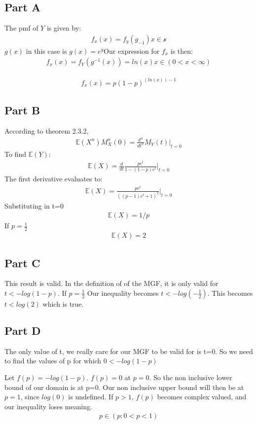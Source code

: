 \documentclass{article}
\begin{document}
\subsection*{Part A}
The pmf of $Y$ is given by:
\begin{align*}
f_x(x) = f_y(g_{-1}) x\in \mathcal{x}
\end{align*}
$g(x)$ in this case is $g(x)=e^y$Our expression for $f_x$ is then:
\begin{align*}
f_x(x) = f_Y(g^{-1}(x)) = ln(x) x\in (0<x<\infty)
\end{align*}

\begin{align*}
\boxed{ f_x(x) = p(1-p)^{(ln(x))-1} }
\end{align*}
\subsection*{Part B}
According to theorem 2.3.2,
\begin{align*}
\mathbb{E}(X^n)M_X^{n}(0) = \frac{d^n}{dt^n}M_Y(t)|_{t=0}
\end{align*}
To find $\mathbb{E}(Y)$:
\begin{align*}
\mathbb{E}(X) = \frac{d}{dt}\frac{pe^t}{1-(1-p)e^t}|_{t=0}
\end{align*}
The first derivative evaluates to:
\begin{align*}
\mathbb{E}(X) = \frac{p e^t}{((p-1)e^t+1)^2}|_{t=0}
\end{align*}
Substituting in t=0
\begin{align*}
\mathbb{E}(X) = 1/p
\end{align*}
If $p=\frac{1}{2}$
\begin{align*}
\boxed{\mathbb{E}(X) = 2}
\end{align*}
\subsection*{Part C}
This result is valid. In the definition of of the MGF, it is only valid for $t < -log(1-p)$. If $p=\frac{1}{2}$
Our inequality becomes $t<-log(-\frac{1}{2})$. This becomes $t<log(2)$ which is true.
\subsection*{Part D}
The only value of t, we really care for our MGF to be valid for is t=0. So we need to find the values of p for which $0<-log(1-p)$

Let $f(p)=-log(1-p)$. $f(p)=0$ at $p=0$. So the non inclusive lower bound of our domain is at p=0. Our non inclusive upper bound will then be at $p=1$, since $log(0)$ is undefined. If $p>1$, $f(p)$ becomes complex valued, and our inequality loses meaning.
\begin{align*}
\boxed{p \in (p: 0<p<1)}
\end{align*}
\end{document}

